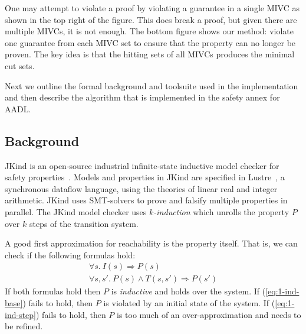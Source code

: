 One may attempt to violate a proof by violating a guarantee in a single MIVC as shown in the top right of the figure. This does break a proof, but given there are multiple MIVCs, it is not enough. The bottom figure shows our method: violate one guarantee from each MIVC set to ensure that the property can no longer be proven. The key idea is that the hitting sets of all MIVCs produces the minimal cut sets. 

Next we outline the formal background and toolsuite used in the implementation and then describe the algorithm that is implemented in the safety annex for AADL. 

\subsection{Background}
JKind is an open-source industrial infinite-state inductive model checker for safety properties~\cite{2017arXiv171201222G}. Models and properties in JKind are specified in Lustre~\cite{Halbwachs91:IEEE}, a synchronous dataflow language, using the theories of linear real and integer arithmetic. JKind uses SMT-solvers to prove and falsify multiple properties in parallel. The JKind model checker uses {\em
  $k$-induction} which unrolls the property $P$ over $k$ steps of the
transition system.


A good first approximation for reachability is the property itself.
That is, we can check if the following formulas hold:
\begin{gather}
  \forall s.~ I(s) \Rightarrow P(s)
  \label{eq:1-ind-base} \\
  \forall s, s'.~ P(s) \land T(s, s') \Rightarrow P(s')
  \label{eq:1-ind-step}
\end{gather}
If both formulas hold then $P$ is {\em inductive} and holds over the
system. If (\ref{eq:1-ind-base}) fails to hold, then $P$ is violated
by an initial state of the system. If (\ref{eq:1-ind-step}) fails to
hold, then $P$ is too much of an over-approximation and needs to be
refined.


